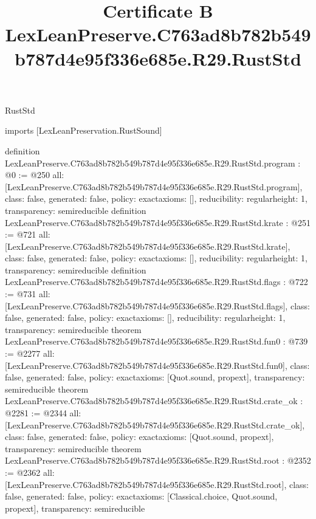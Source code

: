 \begin{lexlean}{RustStd}
\title{Certificate B LexLeanPreserve.C763ad8b782b549b787d4e95f336e685e.R29.RustStd}
\begin{coremodule}
imports [LexLeanPreservation.RustSound]

definition LexLeanPreserve.C763ad8b782b549b787d4e95f336e685e.R29.RustStd.program : @0 := @250 {
  all: [LexLeanPreserve.C763ad8b782b549b787d4e95f336e685e.R29.RustStd.program],
  class: false,
  generated: false,
  policy: exact{axioms: []},
  reducibility: regular{height: 1},
  transparency: semireducible
}
definition LexLeanPreserve.C763ad8b782b549b787d4e95f336e685e.R29.RustStd.krate : @251 := @721 {
  all: [LexLeanPreserve.C763ad8b782b549b787d4e95f336e685e.R29.RustStd.krate],
  class: false,
  generated: false,
  policy: exact{axioms: []},
  reducibility: regular{height: 1},
  transparency: semireducible
}
definition LexLeanPreserve.C763ad8b782b549b787d4e95f336e685e.R29.RustStd.flags : @722 := @731 {
  all: [LexLeanPreserve.C763ad8b782b549b787d4e95f336e685e.R29.RustStd.flags],
  class: false,
  generated: false,
  policy: exact{axioms: []},
  reducibility: regular{height: 1},
  transparency: semireducible
}
theorem LexLeanPreserve.C763ad8b782b549b787d4e95f336e685e.R29.RustStd.fun0 : @739 := @2277 {
  all: [LexLeanPreserve.C763ad8b782b549b787d4e95f336e685e.R29.RustStd.fun0],
  class: false,
  generated: false,
  policy: exact{axioms: [Quot.sound, propext]},
  transparency: semireducible
}
theorem LexLeanPreserve.C763ad8b782b549b787d4e95f336e685e.R29.RustStd.crate_ok : @2281 := @2344 {
  all: [LexLeanPreserve.C763ad8b782b549b787d4e95f336e685e.R29.RustStd.crate_ok],
  class: false,
  generated: false,
  policy: exact{axioms: [Quot.sound, propext]},
  transparency: semireducible
}
theorem LexLeanPreserve.C763ad8b782b549b787d4e95f336e685e.R29.RustStd.root : @2352 := @2362 {
  all: [LexLeanPreserve.C763ad8b782b549b787d4e95f336e685e.R29.RustStd.root],
  class: false,
  generated: false,
  policy: exact{axioms: [Classical.choice, Quot.sound, propext]},
  transparency: semireducible
}


\end{coremodule}
\end{lexlean}
